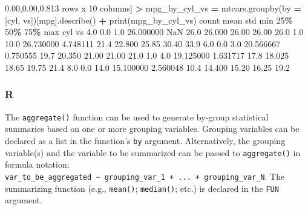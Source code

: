\documentclass[
]{book}
\newenvironment{Shaded}{\begin{snugshade}}{\end{snugshade}}
\newcommand{\BuiltInTok}[1]{#1}
\newcommand{\DecValTok}[1]{\textcolor[rgb]{0.00,0.00,0.81}{#1}}
\newcommand{\FloatTok}[1]{\textcolor[rgb]{0.00,0.00,0.81}{#1}}
\newcommand{\NormalTok}[1]{#1}
\newcommand{\OperatorTok}[1]{\textcolor[rgb]{0.81,0.36,0.00}{\textbf{#1}}}
\newcommand{\StringTok}[1]{\textcolor[rgb]{0.31,0.60,0.02}{#1}}
\begin{document}
\begin{Shaded}
\begin{Highlighting}[]
\NormalTok{[}\DecValTok{3}\NormalTok{ rows x }\DecValTok{10}\NormalTok{ columns]}
\OperatorTok{\textgreater{}}\NormalTok{ mpg\_by\_cyl\_vs }\OperatorTok{=}\NormalTok{ mtcars.groupby(by }\OperatorTok{=}\NormalTok{ [}\StringTok{\textquotesingle{}cyl\textquotesingle{}}\NormalTok{, }\StringTok{\textquotesingle{}vs\textquotesingle{}}\NormalTok{])[}\StringTok{\textquotesingle{}mpg\textquotesingle{}}\NormalTok{].describe()}
\OperatorTok{+} \BuiltInTok{print}\NormalTok{(mpg\_by\_cyl\_vs)}
\NormalTok{         count       mean       std   }\BuiltInTok{min}     \DecValTok{25}\OperatorTok{\%}    \DecValTok{50}\OperatorTok{\%}    \DecValTok{75}\OperatorTok{\%}   \BuiltInTok{max}
\NormalTok{cyl vs                                                               }
\FloatTok{4.0} \FloatTok{0.0}    \FloatTok{1.0}  \FloatTok{26.000000}\NormalTok{       NaN  }\FloatTok{26.0}  \FloatTok{26.000}  \FloatTok{26.00}  \FloatTok{26.00}  \FloatTok{26.0}
    \FloatTok{1.0}   \FloatTok{10.0}  \FloatTok{26.730000}  \FloatTok{4.748111}  \FloatTok{21.4}  \FloatTok{22.800}  \FloatTok{25.85}  \FloatTok{30.40}  \FloatTok{33.9}
\FloatTok{6.0} \FloatTok{0.0}    \FloatTok{3.0}  \FloatTok{20.566667}  \FloatTok{0.750555}  \FloatTok{19.7}  \FloatTok{20.350}  \FloatTok{21.00}  \FloatTok{21.00}  \FloatTok{21.0}
    \FloatTok{1.0}    \FloatTok{4.0}  \FloatTok{19.125000}  \FloatTok{1.631717}  \FloatTok{17.8}  \FloatTok{18.025}  \FloatTok{18.65}  \FloatTok{19.75}  \FloatTok{21.4}
\FloatTok{8.0} \FloatTok{0.0}   \FloatTok{14.0}  \FloatTok{15.100000}  \FloatTok{2.560048}  \FloatTok{10.4}  \FloatTok{14.400}  \FloatTok{15.20}  \FloatTok{16.25}  \FloatTok{19.2}
\end{Highlighting}
\end{Shaded}

\hypertarget{r-37}{%
\subsubsection*{R}\label{r-37}}

The \texttt{aggregate()} function can be used to generate by-group statistical summaries based on one or more grouping variables. Grouping variables can be declared as a list in the function's \texttt{by} argument. Alternatively, the grouping variable(s) and the variable to be summarized can be passed to \texttt{aggregate()} in formula notation: \texttt{var\_to\_be\_aggregated\ \textasciitilde{}\ grouping\_var\_1\ +\ ...\ +\ grouping\_var\_N}. The summarizing function (e.g., \texttt{mean()}; \texttt{median()}; etc.) is declared in the \texttt{FUN} argument.
\end{document}
